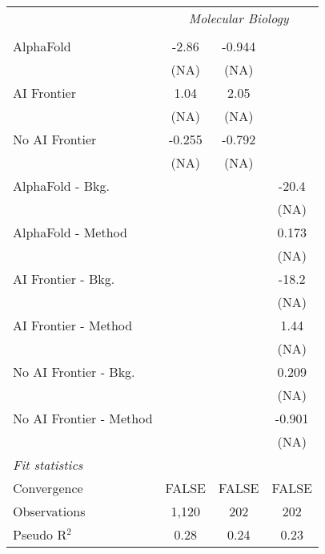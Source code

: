 \begin{tabular}{lccc}
 & \multicolumn{3}{c}{\textit{Molecular Biology}} \\ \\
   AlphaFold               & -2.86  & -0.944 &   \\   
                           & (NA)   & (NA)   &   \\   
   AI Frontier             & 1.04   & 2.05   &   \\   
                           & (NA)   & (NA)   &   \\   
   No AI Frontier          & -0.255 & -0.792 &   \\   
                           & (NA)   & (NA)   &   \\   
   AlphaFold - Bkg.        &        &        & -20.4\\   
                           &        &        & (NA)\\   
   AlphaFold - Method      &        &        & 0.173\\   
                           &        &        & (NA)\\   
   AI Frontier - Bkg.      &        &        & -18.2\\   
                           &        &        & (NA)\\   
   AI Frontier - Method    &        &        & 1.44\\   
                           &        &        & (NA)\\   
   No AI Frontier - Bkg.   &        &        & 0.209\\   
                           &        &        & (NA)\\   
   No AI Frontier - Method &        &        & -0.901\\   
                           &        &        & (NA)\\   
   \midrule
   \emph{Fit statistics}\\
   Convergence             &FALSE   & FALSE  & FALSE\\  
   Observations            & 1,120  & 202    & 202\\  
   Pseudo R$^2$            & 0.28   & 0.24   & 0.23\\  
   

\end{tabular}

